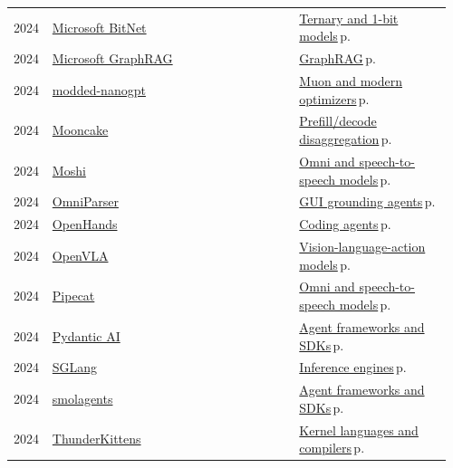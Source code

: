 \documentclass[10pt,a4paper,openany]{report}
\begin{document}
{\begin{longtable}{@{}p{0.07\linewidth}>{\raggedright}p{0.55\linewidth}>{\raggedright\arraybackslash}p{0.34\linewidth}@{}}
2024 & \href{https://github.com/microsoft/BitNet}{Microsoft BitNet} & \hyperref[c:quant-6]{Ternary and 1-bit models}\,{\color{muted}\scriptsize p.\,\pageref{c:quant-6}}\\
2024 & \href{https://github.com/microsoft/graphrag}{Microsoft GraphRAG} & \hyperref[c:context-7]{GraphRAG}\,{\color{muted}\scriptsize p.\,\pageref{c:context-7}}\\
2024 & \href{https://github.com/KellerJordan/modded-nanogpt}{modded-nanogpt} & \hyperref[c:training-2]{Muon and modern optimizers}\,{\color{muted}\scriptsize p.\,\pageref{c:training-2}}\\
2024 & \href{https://github.com/kvcache-ai/Mooncake}{Mooncake} & \hyperref[c:inference-3]{Prefill/decode disaggregation}\,{\color{muted}\scriptsize p.\,\pageref{c:inference-3}}\\
2024 & \href{https://github.com/kyutai-labs/moshi}{Moshi} & \hyperref[c:vlm-7]{Omni and speech-to-speech models}\,{\color{muted}\scriptsize p.\,\pageref{c:vlm-7}}\\
2024 & \href{https://github.com/microsoft/OmniParser}{OmniParser} & \hyperref[c:vlm-6]{GUI grounding agents}\,{\color{muted}\scriptsize p.\,\pageref{c:vlm-6}}\\
2024 & \href{https://github.com/OpenHands/OpenHands}{OpenHands} & \hyperref[c:coding-0]{Coding agents}\,{\color{muted}\scriptsize p.\,\pageref{c:coding-0}}\\
2024 & \href{https://github.com/openvla/openvla}{OpenVLA} & \hyperref[c:embodied-0]{Vision-language-action models}\,{\color{muted}\scriptsize p.\,\pageref{c:embodied-0}}\\
2024 & \href{https://github.com/pipecat-ai/pipecat}{Pipecat} & \hyperref[c:vlm-7]{Omni and speech-to-speech models}\,{\color{muted}\scriptsize p.\,\pageref{c:vlm-7}}\\
2024 & \href{https://github.com/pydantic/pydantic-ai}{Pydantic AI} & \hyperref[c:agents-12]{Agent frameworks and SDKs}\,{\color{muted}\scriptsize p.\,\pageref{c:agents-12}}\\
2024 & \href{https://github.com/sgl-project/sglang}{SGLang} & \hyperref[c:inference-0]{Inference engines}\,{\color{muted}\scriptsize p.\,\pageref{c:inference-0}}\\
2024 & \href{https://github.com/huggingface/smolagents}{smolagents} & \hyperref[c:agents-12]{Agent frameworks and SDKs}\,{\color{muted}\scriptsize p.\,\pageref{c:agents-12}}\\
2024 & \href{https://github.com/HazyResearch/ThunderKittens}{ThunderKittens} & \hyperref[c:hardware-13]{Kernel languages and compilers}\,{\color{muted}\scriptsize p.\,\pageref{c:hardware-13}}\\

\end{longtable}}
\end{document}
